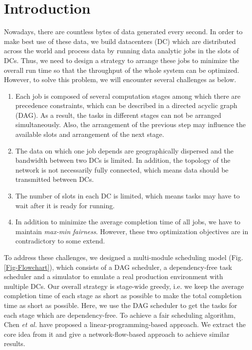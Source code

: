 \section{Introduction}
Nowadays, there are countless bytes of data generated every second. In order to make best use of these data, we build datacenters (DC) which are distributed across the world and process data by running data analytic jobs in the slots of DCs. Thus, we need to design a strategy to arrange these jobs to minimize the overall run time so that the throughput of the whole system can be optimized. However, to solve this problem, we will encounter several challenges as below.
\begin{enumerate}
    \item Each job is composed of several computation stages among which there are precedence constraints, which can be described in a directed acyclic graph (DAG). As a result, the tasks in different stages can not be arranged simultaneously. Also, the arrangement of the previous step may influence the available slots and arrangement of the next stage.
    \item The data on which one job depends are geographically dispersed and the bandwidth between two DCs is limited. In addition, the topology of the network is not necessarily fully connected, which means data should be transmitted between DCs.
    \item The number of slots in each DC is limited, which means tasks may have to wait after it is ready for running.
    \item In addition to minimize the average completion time of all jobs, we have to maintain \emph{max-min fairness}. However, these two optimization objectives are in contradictory to some extend.
\end{enumerate}

To address these challenges, we designed a multi-module scheduling model (Fig. \ref{Fig-Flowchart}), which consists of a DAG scheduler, a dependency-free task scheduler and a simulator to emulate a real production environment with multiple DCs. Our overall strategy is stage-wide greedy, i.e. we keep the average completion time of each stage as short as possible to make the total completion time as short as possible. Here, we use the DAG scheduler to get the tasks for each stage which are dependency-free. To achieve a fair scheduling algorithm, Chen \emph{et al.} \cite{LP-paper} have proposed a linear-programming-based approach. We extract the core idea from it and give a network-flow-based approach to achieve similar results.

% 